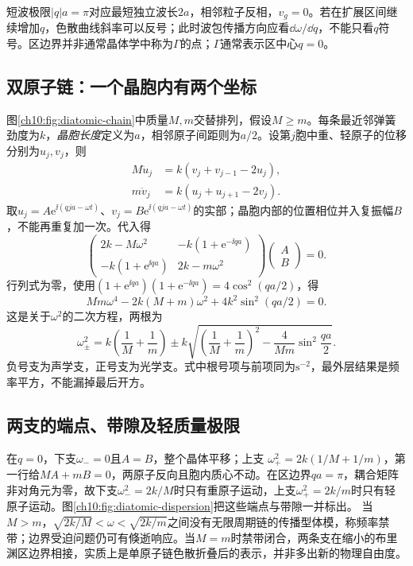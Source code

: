 短波极限$|q|a=\pi$对应最短独立波长$2a$，相邻粒子反相，$v_g=0$。若在扩展区间继续增加$q$，色散曲线斜率可以反号；此时波包传播方向应看$\dd\omega/\dd q$，不能只看$q$符号。区边界并非通常晶体学中称为$\Gamma$的点；$\Gamma$通常表示区中心$q=0$。

\subsection{双原子链：一个晶胞内有两个坐标}
图\ref{ch10:fig:diatomic-chain}中质量$M,m$交替排列，假设$M\geq m$。每条最近邻弹簧劲度为$k$，\emph{晶胞长度}定义为$a$，相邻原子间距则为$a/2$。设第$j$胞中重、轻原子的位移分别为$u_j,v_j$，则
\begin{align}
 M\ddot u_j&=k(v_j+v_{j-1}-2u_j),\label{ch10:eq:diatomic-M}\\
 m\ddot v_j&=k(u_j+u_{j+1}-2v_j).\label{ch10:eq:diatomic-m}
\end{align}
\chTenDiatomicChainFigure
取$u_j=A\mathrm e^{\ii(qja-\omega t)}$、$v_j=B\mathrm e^{\ii(qja-\omega t)}$的实部；晶胞内部的位置相位并入复振幅$B$，不能再重复加一次。代入得
\[
 \begin{pmatrix}
 2k-M\omega^2&-k(1+\mathrm e^{-\ii qa})\\
 -k(1+\mathrm e^{\ii qa})&2k-m\omega^2
 \end{pmatrix}\begin{pmatrix}A\\B\end{pmatrix}=0.
\]
行列式为零，使用$(1+\mathrm e^{\ii qa})(1+\mathrm e^{-\ii qa})=4\cos^2(qa/2)$，得
\[
 Mm\omega^4-2k(M+m)\omega^2+4k^2\sin^2(qa/2)=0.
\]
这是关于$\omega^2$的二次方程，两根为
\begin{equation}\label{ch10:eq:diatomic-dispersion}
 \omega_\pm^2=k\left(\frac1M+\frac1m\right)
 \pm k\sqrt{\left(\frac1M+\frac1m\right)^2-
 \frac4{Mm}\sin^2\frac{qa}{2}}.
\end{equation}
负号支为声学支，正号支为光学支。式中根号项与前项同为$\mathrm{s^{-2}}$，最外层结果是频率平方，不能漏掉最后开方。

\subsection{两支的端点、带隙及轻质量极限}
在$q=0$，下支$\omega_-=0$且$A=B$，整个晶体平移；上支
$\omega_+^2=2k(1/M+1/m)$，第一行给$MA+mB=0$，两原子反向且胞内质心不动。在区边界$qa=\pi$，耦合矩阵非对角元为零，故下支$\omega_-^2=2k/M$时只有重原子运动，上支$\omega_+^2=2k/m$时只有轻原子运动。图\ref{ch10:fig:diatomic-dispersion}把这些端点与带隙一并标出。
\chTenDiatomicDispersionFigure
当$M>m$，$\sqrt{2k/M}<\omega<\sqrt{2k/m}$之间没有无限周期链的传播型体模，称频率禁带；边界受迫问题仍可有倏逝响应。当$M=m$时禁带闭合，两条支在缩小的布里渊区边界相接，实质上是单原子链色散折叠后的表示，并非多出新的物理自由度。


